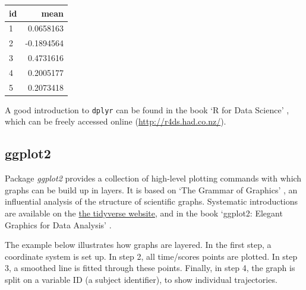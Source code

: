 \documentclass[]{book}
\begin{document}
\begin{tabular}{l|r}
\hline
id & mean\\
\hline
1 & 0.0658163\\
\hline
2 & -0.1894564\\
\hline
3 & 0.4731616\\
\hline
4 & 0.2005177\\
\hline
5 & 0.2073418\\
\hline
\end{tabular}

A good introduction to \texttt{dplyr} can be found in the book `R for
Data Science' \citep{wickham2016r}, which can be freely accessed online
(\url{http://r4ds.had.co.nz/}).

\subsection{ggplot2}\label{ggplot2}


Package \emph{ggplot2} \citep{wickham2016ggplot2} provides a collection
of high-level plotting commands with which graphs can be build up in
layers. It is based on `The Grammar of Graphics' \citep{wilkinson2006},
an influential analysis of the structure of scientific graphs.
Systematic introductions are available on the
\href{http://ggplot2.tidyverse.org/}{the tidyverse website}, and in the
book `ggplot2: Elegant Graphics for Data Analysis'
\citep{wickham2016ggplot2}.

The example below illustrates how graphs are layered. In the first step,
a coordinate system is set up. In step 2, all time/scores points are
plotted. In step 3, a smoothed line is fitted through these points.
Finally, in step 4, the graph is split on a variable ID (a subject
identifier), to show individual trajectories.
\end{document}
